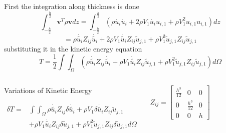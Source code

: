 \documentclass[9pt]{beamer}
\begin{document}
\begin{frame}
First the integration along thickness is done
\begin{equation*}
\int_{-\frac{h}{2}}^{\frac{h}{2}} \mathbf{v}^T\rho\mathbf{v} dz =
\int_{-\frac{h}{2}}^{\frac{h}{2}}
\left(
\rho\dot{u_i}\dot{u_i}
+
2 \rho V_1 \dot{u_i} u_{i,1}
+
\rho V_1^2 u_{i,1} u_{i,1}
\right) dz
\end{equation*}
\begin{equation*}
 =
\rho \dot{\tilde{u_i}} Z_{ij} \dot{\tilde{u_i}}
+
2 \rho V_1 \dot{\tilde{u_i}} Z_{ij} \tilde{u}_{j,1} 
+
\rho V_1^2 \tilde{u}_{j,1} Z_{ij} \tilde{u}_{j,1}
\end{equation*}
substituting it in the kinetic energy equation
\begin{equation*}
T = \frac{1}{2} \int \int_\Omega \left(
\rho \dot{\tilde{u_i}} Z_{ij} \dot{\tilde{u_i}}
+
\rho V_1 \dot{\tilde{u_i}} Z_{ij} \tilde{u}_{j,1} 
+
\rho V_1^2 \tilde{u}_{j,1} Z_{ij} \tilde{u}_{j,1}
 \right) d\Omega
\end{equation*}
\begin{columns}
\begin{block}{Variations of Kinetic Energy}


\begin{equation*}
\begin{split}
\delta T = & \int \int_\Omega 
\rho \dot{\tilde{u_i}} Z_{ij} \delta \dot{\tilde{u_i}}
+
\rho V_1 \delta \dot{\tilde{u_i}} Z_{ij} \tilde{u}_{j,1} \\ &
  +  
\rho V_1  \dot{\tilde{u_i}} Z_{ij} \delta \tilde{u}_{j,1} 
+
\rho V_1^2 \tilde{u}_{j,1} Z_{ij} \delta \tilde{u}_{j,1}
 d\Omega
\end{split}
\end{equation*}

\end{block}

\begin{equation*}
Z_{ij}=
\begin{bmatrix}
\frac{h^3}{12} & 0 & 0 \\
0 & \frac{h^3}{12} &  0 \\
0 &   0 & h 
\end{bmatrix}
\end{equation*}
\end{columns}

\end{frame}
\end{document}
